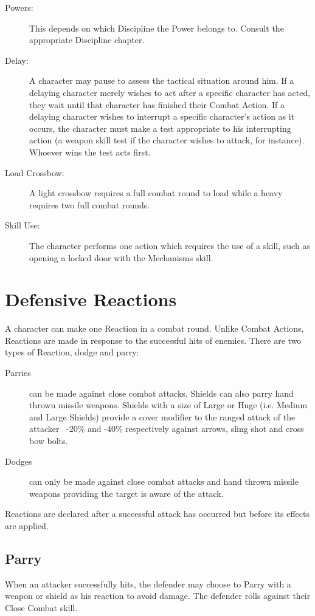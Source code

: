 \begin{description}
\item[Powers:] This depends on which Discipline the Power belongs to. Consult the appropriate Discipline chapter.
\item[Delay:] A character may pause to assess the tactical situation around him. If a delaying character merely wishes to act after a specific character has acted, they wait until that character has finished their Combat Action. If a delaying character wishes to interrupt a specific character’s action as it occurs, the character must make a test appropriate to his interrupting action (a weapon skill test if the character wishes to attack, for instance). Whoever wins the test acts first. 
\item[Load Crossbow:] A light crossbow requires a full combat round to load while a heavy requires two full combat rounds.
\item[Skill Use:] The character performs one action which requires the use of a skill, such as opening a locked door with the Mechanisms skill.
\end{description}


\section{Defensive Reactions}
A character can make one Reaction in a combat round. Unlike Combat Actions, Reactions are made in response to the successful hits of enemies. There are two types of Reaction, dodge and parry:

\begin{description}
	\item[Parries] can be made against close combat attacks. Shields can also parry hand thrown missile weapons. Shields with a size of Large or Huge (i.e. Medium and Large Shields) provide a cover modifier to the ranged attack of the attacker  -20\% and -40\% respectively against arrows, sling shot and cross bow bolts. 
	\item[Dodges] can only be made against close combat attacks and hand thrown missile weapons providing the target is aware of the attack.  
\end{description}

\noindent Reactions are declared after a successful attack has occurred but before its effects are applied. 

\subsection{Parry}
When an attacker successfully hits, the defender may choose to Parry with a weapon or shield as his reaction to avoid damage. The defender rolls against their Close Combat skill. 

